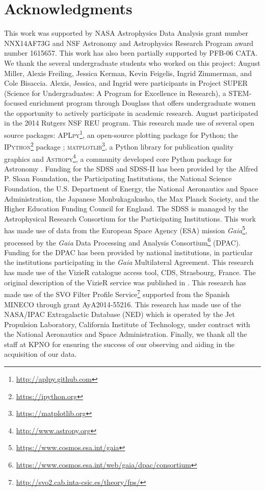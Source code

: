 \documentclass[apj, revtex4-1]{emulateapj}
\begin{document}
\section*{Acknowledgments}
This work was supported by NASA Astrophysics Data Analysis grant number NNX14AF73G and NSF Astronomy and Astrophysics Research Program award number 1615657. This work has also been partially supported by PFB-06 CATA. We thank the several undergraduate students who worked on this project: August Miller, Alexis Freiling, Jessica Kerman, Kevin Feigelis, Ingrid Zimmerman, and Cole Bisaccia. Alexis, Jessica, and Ingrid were participants in Project SUPER (Science for Undergraduates: A Program for Excellence in Research), a STEM-focused enrichment program through Douglass that offers undergraduate women the opportunity to actively participate in academic research. August participated in the 2014 Rutgers NSF REU program.
This research made use of several open source packages: \textsc{APLpy}\footnote{\url{http://aplpy.github.com}}, an open-source plotting package for Python; the \textsc{IPython}\footnote{\url{https://ipython.org}} package \citep{Perez2007}; \textsc{matplotlib}\footnote{\url{https://matplotlib.org}}, a Python library for publication quality graphics \citep{Hunter2007} and \textsc{Astropy}\footnote{\url{http://www.astropy.org}}, a community developed core Python package for Astronomy \citep{TheAstropyCollaboration2013}.
Funding for the SDSS and SDSS-II has been provided by the Alfred P. Sloan Foundation, the Participating Institutions, the National Science Foundation, the U.S. Department of Energy, the National Aeronautics and Space Administration, the Japanese Monbukagakusho, the Max Planck Society, and the Higher Education Funding Council for England. The SDSS is managed by the Astrophysical Research Consortium for the Participating Institutions.
This work has made use of data from the European Space Agency (ESA) mission \textit{Gaia}\footnote{\url{https://www.cosmos.esa.int/gaia}}, processed by the \textit{Gaia} Data Processing and Analysis Consortium\footnote{\url{https://www.cosmos.esa.int/web/gaia/dpac/consortium}} (DPAC). Funding for the DPAC has been provided by national institutions, in particular the institutions participating in the \textit{Gaia} Multilateral Agreement.
This research has made use of the VizieR catalogue access tool, CDS, Strasbourg, France. The original description of the VizieR service was published in \cite{Ochsenbein2000}.
This research has made use of the SVO Filter Profile Service\footnote{\url{http://svo2.cab.inta-csic.es/theory/fps/}} supported from the Spanish MINECO through grant AyA2014-55216.
This research has made use of the NASA/IPAC Extragalactic Database (NED) which is operated by the Jet Propulsion Laboratory, California Institute of Technology, under contract with the National Aeronautics and Space Administration.
Finally, we thank all the staff at KPNO for ensuring the success of our observing and aiding in the acquisition of our data.
\end{document}
